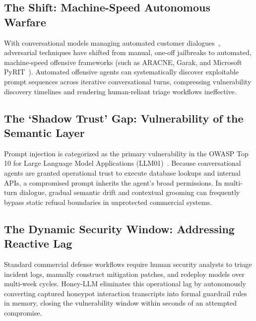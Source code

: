\documentclass[12pt,a4paper,oneside]{report}
\begin{document}
\subsection{The Shift: Machine-Speed Autonomous Warfare}
With conversational models managing automated customer dialogues~\cite{openai2023gpt4}, adversarial techniques have shifted from manual, one-off jailbreaks to automated, machine-speed offensive frameworks (such as ARACNE, Garak, and Microsoft PyRIT~\cite{pyrit2024}). Automated offensive agents can systematically discover exploitable prompt sequences across iterative conversational turns, compressing vulnerability discovery timelines and rendering human-reliant triage workflows ineffective.

\subsection{The `Shadow Trust' Gap: Vulnerability of the Semantic Layer}
Prompt injection is categorized as the primary vulnerability in the OWASP Top 10 for Large Language Model Applications (LLM01)~\cite{owasp2023top10}. Because conversational agents are granted operational trust to execute database lookups and internal APIs, a compromised prompt inherits the agent's broad permissions. In multi-turn dialogue, gradual semantic drift and contextual grooming can frequently bypass static refusal boundaries in unprotected commercial systems.

\subsection{The Dynamic Security Window: Addressing Reactive Lag}
Standard commercial defense workflows require human security analysts to triage incident logs, manually construct mitigation patches, and redeploy models over multi-week cycles. Honey-LLM eliminates this operational lag by autonomously converting captured honeypot interaction transcripts into formal guardrail rules in memory, closing the vulnerability window within seconds of an attempted compromise.
\end{document}
